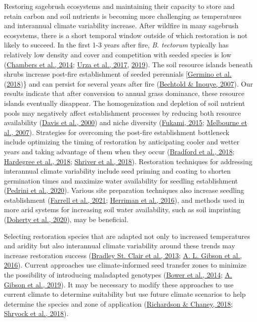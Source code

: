 \documentclass[
  11pt,
  a4paper,
]{article}
\begin{document}
Restoring sagebrush ecosystems and maintaining their capacity to store and retain carbon and soil nutrients is becoming more challenging as temperatures and interannual climate variability increase. After wildfire in many sagebrush ecosystems, there is a short temporal window outside of which restoration is not likely to succeed. In the first 1-3 years after fire, \emph{B. tectorum} typically has relatively low density and cover and competition with seeded species is low (\protect\hyperlink{ref-Chambers2014rem}{Chambers et al., 2014}; \protect\hyperlink{ref-Urza2017}{Urza et al., 2017}, \protect\hyperlink{ref-Urza2019}{2019}). The soil resource islands beneath shrubs increase post-fire establishment of seeded perennials {[}\protect\hyperlink{ref-Germino2018}{Germino et al.} (\protect\hyperlink{ref-Germino2018}{2018})\} and can persist for several years after fire (\protect\hyperlink{ref-Bechtold2007}{Bechtold \& Inouye, 2007}). Our results indicate that after conversion to annual grass dominance, these resource islands eventually disappear. The homogenization and depletion of soil nutrient pools may negatively affect establishment processes by reducing both resource availability (\protect\hyperlink{ref-Davis2000}{Davis et al., 2000}) and niche diversity (\protect\hyperlink{ref-Fukami2015}{Fukami, 2015}; \protect\hyperlink{ref-Melbourne2007}{Melbourne et al., 2007}). Strategies for overcoming the post-fire establishment bottleneck include optimizing the timing of restoration by anticipating cooler and wetter years and taking advantage of them when they occur (\protect\hyperlink{ref-Bradford2018}{Bradford et al., 2018}; \protect\hyperlink{ref-Hardegree2018}{Hardegree et al., 2018}; \protect\hyperlink{ref-Shriver2018}{Shriver et al., 2018}). Restoration techniques for addressing interannual climate variability include seed priming and coating to shorten germination times and maximize water availability for seedling establishment (\protect\hyperlink{ref-Pedrini2020}{Pedrini et al., 2020}). Various site preparation techniques also increase seedling establishment (\protect\hyperlink{ref-Farrell2021}{Farrell et al., 2021}; \protect\hyperlink{ref-Herriman2016}{Herriman et al., 2016}), and methods used in more arid systems for increasing soil water availability, such as soil imprinting (\protect\hyperlink{ref-Doherty2020}{Doherty et al., 2020}), may be beneficial.

Selecting restoration species that are adapted not only to increased temperatures and aridity but also interannual climate variability around these trends may increase restoration success (\protect\hyperlink{ref-bradley_st_clair_genetic_2013}{Bradley St. Clair et al., 2013}; \protect\hyperlink{ref-Gibson2016eva}{A. L. Gibson et al., 2016}). Current approaches use climate-informed seed transfer zones to minimize the possibility of introducing maladapted genotypes (\protect\hyperlink{ref-Bower2014}{Bower et al., 2014}; \protect\hyperlink{ref-Gibson2019}{A. Gibson et al., 2019}). It may be necessary to modify these approaches to use current climate to determine suitability but use future climate scenarios to help determine the species and zone of application (\protect\hyperlink{ref-Richardson2018}{Richardson \& Chaney, 2018}; \protect\hyperlink{ref-Shryock2018}{Shryock et al., 2018}).
\end{document}

